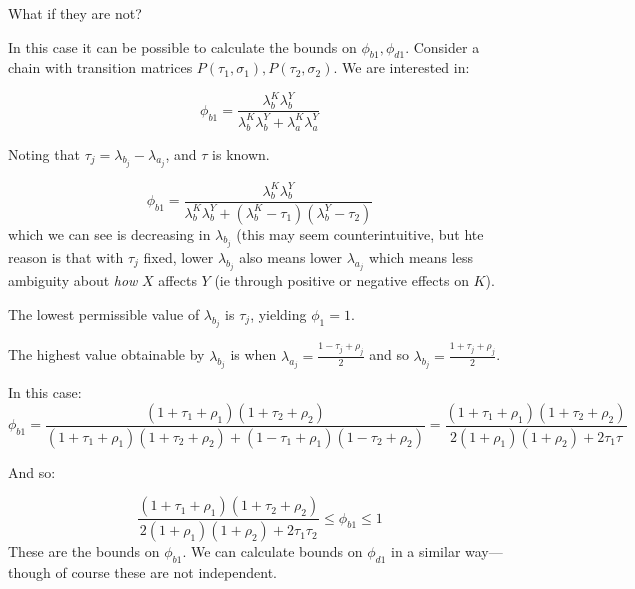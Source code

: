 \documentclass[12pt,]{book}
\begin{document}
What if they are not?

In this case it can be possible to calculate the bounds on \(\phi_{b1}, \phi_{d1}\). Consider a chain with transition matrices \(P(\tau_1, \sigma_1), P(\tau_2, \sigma_2)\). We are interested in:

\[\phi_{b1} = \frac{\lambda_{b}^K\lambda_{b}^Y}{\lambda_{b}^K\lambda_{b}^Y + \lambda_{a}^K\lambda_{a}^Y}\]

Noting that \(\tau_j = \lambda_{b_j} - \lambda_{a_j}\), and \(\tau\) is known.

\[\phi_{b1} = \frac{\lambda_{b}^K\lambda_{b}^Y}{\lambda_{b}^K\lambda_{b}^Y + (\lambda_{b}^K-\tau_1)(\lambda_{b}^Y - \tau_2)}\]
which we can see is decreasing in \(\lambda_{b_j}\) (this may seem counterintuitive, but hte reason is that with \(\tau_j\) fixed, lower \(\lambda_{b_j}\) also means lower \(\lambda_{a_j}\) which means less ambiguity about \emph{how} \(X\) affects \(Y\) (ie through positive or negative effects on \(K\)).

The lowest permissible value of \(\lambda_{b_j}\) is \(\tau_j\), yielding \(\phi_1 = 1\).

The highest value obtainable by \(\lambda_{b_j}\) is when \(\lambda_{a_j} = \frac{1-\tau_j+\rho_j}2\) and so \(\lambda_{b_j} = \frac{1+\tau_j+\rho_j}2\).

In this case:
\[\phi_{b1} = \frac{(1+\tau_1+\rho_1)(1+\tau_2+\rho_2)}{(1+\tau_1+\rho_1)(1+\tau_2+\rho_2) + (1-\tau_1+\rho_1)(1-\tau_2+\rho_2)}= \frac{(1+\tau_1+\rho_1)(1+\tau_2+\rho_2)}{2(1+\rho_1)(1+\rho_2) + 2\tau_1\tau}\]

And so:

\[\frac{(1+\tau_1+\rho_1)(1+\tau_2+\rho_2)}{2(1+\rho_1)(1+\rho_2) + 2\tau_1\tau_2} \leq \phi_{b1} \leq 1\]
These are the bounds on \(\phi_{b1}\). We can calculate bounds on \(\phi_{d1}\) in a similar way---though of course these are not independent.
\end{document}
